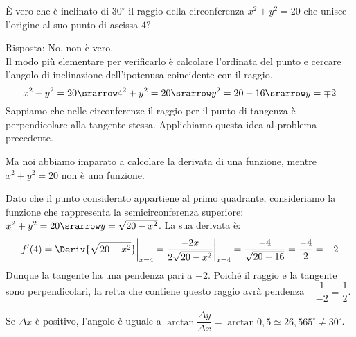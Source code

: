 \begin{esempio}
È vero che è inclinato di \(30^\circ\) il raggio 
della circonferenza \(x^2+y^2=20\) che unisce l'origine al suo punto di 
ascissa \(4\)?

Risposta: No, non è vero. \\
Il modo più elementare per verificarlo è calcolare l'ordinata
del punto e cercare l'angolo di inclinazione dell'ipotenusa coincidente 
con il raggio.
\[x^2+y^2=20 \srarrow 4^2+y^2=20 \srarrow y^2=20 -16 \srarrow y = \mp 2\]
Sappiamo che nelle circonferenze il raggio per il punto di tangenza è 
perpendicolare alla tangente stessa. 
Applichiamo questa idea al problema precedente.

Ma noi abbiamo imparato a calcolare 
la derivata di una funzione, mentre \(x^2+y^2=20\) non è una funzione.

Dato che il punto considerato appartiene al primo quadrante, consideriamo 
la funzione che rappresenta la semicirconferenza superiore:
\(x^2+y^2 = 20 \srarrow y = \sqrt{20-x^2}\). 
La sua derivata è:
\[f'(4)= \Deriv{\sqrt{20-x^2}}\bigg|_{x=4} =
\dfrac{-2x}{2\sqrt{20-x^2}}\bigg|_{x=4}=
\dfrac{-4}{\sqrt{20-16}}=\dfrac{-4}{2}=-2\]
Dunque la tangente ha una pendenza pari a \(-2\). Poiché il raggio e la 
tangente sono perpendicolari, la retta che contiene questo raggio avrà 
pendenza \(-\dfrac{1}{-2}=\dfrac{1}{2}\).

Se \(\Delta x\) è positivo, l'angolo è uguale a 
\(\arctan \dfrac{\Delta y}{\Delta x} = 
  \arctan 0,5 \simeq 26,565^\circ \neq 30^\circ\).
\end{esempio}

